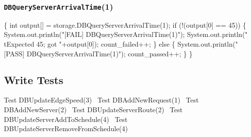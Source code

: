 \documentclass{article}
\def\nwendcode{\endtrivlist \endgroup}
\let\nwdocspar=\par
\begin{document}
\subsubsection{{\tt{}DBQueryServerArrivalTime}(1)}
\nwenddocs{}\endmoddef{}
\{
  int output[] = storage.DBQueryServerArrivalTime(1);
  if (!(output[0] == 45)) \{
    System.out.println("[FAIL] DBQueryServerArrivalTime(1)");
    System.out.println("\\tExpected 45; got "+output[0]);
    count_failed++;
  \} else \{
    System.out.println("[PASS] DBQueryServerArrivalTime(1)");
    count_passed++;
  \}
\}
\nwendcode{}\nwdocspar

\subsection{Write Tests}
\label{sec:write-tests}
\nwenddocs{}\endmoddef{}
\LA{}Test \code{}DBUpdateEdgeSpeed\edoc{}(3)~{\nwtagstyle{}}\RA{}
\LA{}Test \code{}DBAddNewRequest\edoc{}(1)~{\nwtagstyle{}}\RA{}
\LA{}Test \code{}DBAddNewServer\edoc{}(2)~{\nwtagstyle{}}\RA{}
\LA{}Test \code{}DBUpdateServerRoute\edoc{}(2)~{\nwtagstyle{}}\RA{}
\LA{}Test \code{}DBUpdateServerAddToSchedule\edoc{}(4)~{\nwtagstyle{}}\RA{}
\LA{}Test \code{}DBUpdateServerRemoveFromSchedule\edoc{}(4)~{\nwtagstyle{}}\RA{}
\nwendcode{}\nwdocspar
\end{document}
